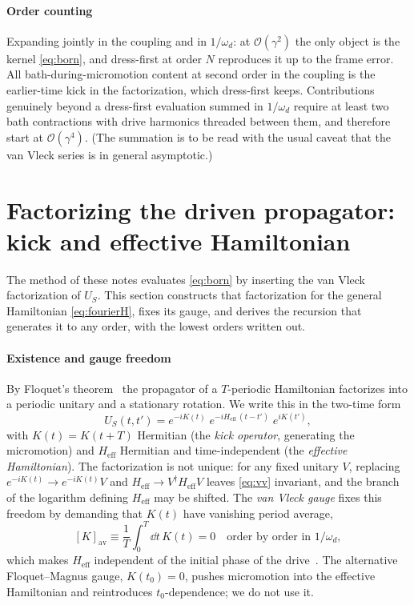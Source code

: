 \documentclass[a4paper,11pt]{article}
\newcommand{\av}[1]{\left[#1\right]_{\mathrm{av}}}
\newcommand{\eff}{\mathrm{eff}}
\begin{document}
\paragraph{Order counting}
Expanding jointly in the coupling and in $1/\omega_d$: at $\mathcal O(\gamma^2)$ the only object is the kernel \eqref{eq:born}, and dress-first at order $N$ reproduces it up to the frame error. All bath-during-micromotion content at second order in the coupling is the earlier-time kick in the factorization, which dress-first keeps. Contributions genuinely beyond a dress-first evaluation summed in $1/\omega_d$ require at least two bath contractions with drive harmonics threaded between them, and therefore start at $\mathcal O(\gamma^4)$. (The summation is to be read with the usual caveat that the van Vleck series is in general asymptotic.)

\section{Factorizing the driven propagator: kick and effective Hamiltonian}\label{sec:vv}

The method of these notes evaluates \cref{eq:born} by inserting the van Vleck factorization of $U_S$. This section constructs that factorization for the general Hamiltonian \eqref{eq:fourierH}, fixes its gauge, and derives the recursion that generates it to any order, with the lowest orders written out.

\paragraph{Existence and gauge freedom}
By Floquet's theorem~\cite{Shirley1965,Sambe1973} the propagator of a $T$-periodic Hamiltonian factorizes into a periodic unitary and a stationary rotation. We write this in the two-time form
\begin{equation}\label{eq:vv}
  U_S(t,t') = e^{-iK(t)}\;e^{-iH_\eff\,(t-t')}\;e^{iK(t')},
\end{equation}
with $K(t) = K(t+T)$ Hermitian (the \emph{kick operator}, generating the micromotion) and $H_\eff$ Hermitian and time-independent (the \emph{effective Hamiltonian}). The factorization is not unique: for any fixed unitary $V$, replacing $e^{-iK(t)} \to e^{-iK(t)}V$ and $H_\eff \to V^\dagger H_\eff V$ leaves \cref{eq:vv} invariant, and the branch of the logarithm defining $H_\eff$ may be shifted. The \emph{van Vleck gauge} fixes this freedom by demanding that $K(t)$ have vanishing period average,
\begin{equation}\label{eq:gauge}
  \av{K} \equiv \frac1T\int_0^T \dd t\, K(t) = 0
  \quad\text{order by order in } 1/\omega_d,
\end{equation}
which makes $H_\eff$ independent of the initial phase of the drive~\cite{Eckardt2015High,Goldman2014,Bukov2015}. The alternative Floquet--Magnus gauge, $K(t_0) = 0$, pushes micromotion into the effective Hamiltonian and reintroduces $t_0$-dependence; we do not use it.
\end{document}
